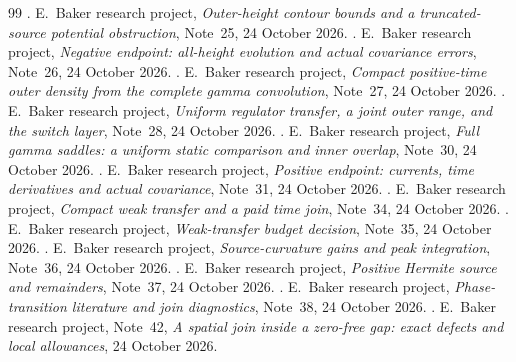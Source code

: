 \begin{thebibliography}{99}
.
E.~Baker research project, \emph{Outer-height contour bounds and a truncated-source potential obstruction}, Note~25,
24 October 2026.
.
E.~Baker research project, \emph{Negative endpoint: all-height evolution and actual covariance errors}, Note~26,
24 October 2026.
.
E.~Baker research project, \emph{Compact positive-time outer density from the complete gamma convolution}, Note~27,
24 October 2026.
.
E.~Baker research project, \emph{Uniform regulator transfer, a joint outer range, and the switch layer}, Note~28,
24 October 2026.
.
E.~Baker research project, \emph{Full gamma saddles: a uniform static comparison and inner overlap}, Note~30,
24 October 2026.
.
E.~Baker research project, \emph{Positive endpoint: currents, time
derivatives and actual covariance}, Note~31, 24 October 2026.
.
E.~Baker research project, \emph{Compact weak transfer and a paid time join},
Note~34, 24 October 2026.
.
E.~Baker research project, \emph{Weak-transfer budget decision}, Note~35,
24 October 2026.
.
E.~Baker research project, \emph{Source-curvature gains and peak integration},
Note~36, 24 October 2026.
.
E.~Baker research project, \emph{Positive Hermite source and remainders},
Note~37, 24 October 2026.
.
E.~Baker research project, \emph{Phase-transition literature and join diagnostics},
Note~38, 24 October 2026.
.
E.~Baker research project, Note~42, \emph{A spatial join inside a zero-free
gap: exact defects and local allowances}, 24 October 2026.

\end{thebibliography}
